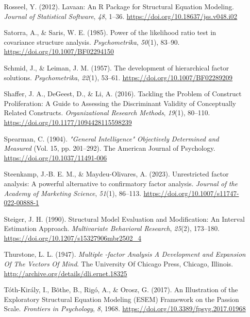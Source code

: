 \documentclass[
  american,
  man,floatsintext]{apa7}
\newlength{\cslhangindent}
\newenvironment{CSLReferences}[2] %
 {\begin{list}{}{%
  \setlength{\itemindent}{0pt}
  \setlength{\leftmargin}{0pt}
  \setlength{\parsep}{0pt}
  \ifodd #1
   \setlength{\leftmargin}{\cslhangindent}
   \setlength{\itemindent}{-1\cslhangindent}
  \fi
  \setlength{\itemsep}{#2\baselineskip}}}
 {\end{list}}
\begin{document}
\begin{CSLReferences}{1}{0}
Rosseel, Y. (2012). Lavaan: {An R Package} for {Structural Equation Modeling}. \emph{Journal of Statistical Software}, \emph{48}, 1--36. \url{https://doi.org/10.18637/jss.v048.i02}

Satorra, A., \& Saris, W. E. (1985). Power of the likelihood ratio test in covariance structure analysis. \emph{Psychometrika}, \emph{50}(1), 83--90. \url{https://doi.org/10.1007/BF02294150}

Schmid, J., \& Leiman, J. M. (1957). The development of hierarchical factor solutions. \emph{Psychometrika}, \emph{22}(1), 53--61. \url{https://doi.org/10.1007/BF02289209}

Shaffer, J. A., DeGeest, D., \& Li, A. (2016). Tackling the {Problem} of {Construct Proliferation}: {A Guide} to {Assessing} the {Discriminant Validity} of {Conceptually Related Constructs}. \emph{Organizational Research Methods}, \emph{19}(1), 80--110. \url{https://doi.org/10.1177/1094428115598239}

Spearman, C. (1904). \emph{"{General Intelligence}" {Objectively Determined} and {Measured}} (Vol. 15, pp. 201--292). The American Journal of Psychology. \url{https://doi.org/10.1037/11491-006}

Steenkamp, J.-B. E. M., \& Maydeu-Olivares, A. (2023). Unrestricted factor analysis: {A} powerful alternative to confirmatory factor analysis. \emph{Journal of the Academy of Marketing Science}, \emph{51}(1), 86--113. \url{https://doi.org/10.1007/s11747-022-00888-1}

Steiger, J. H. (1990). Structural {Model Evaluation} and {Modification}: {An Interval Estimation Approach}. \emph{Multivariate Behavioral Research}, \emph{25}(2), 173--180. \url{https://doi.org/10.1207/s15327906mbr2502_4}

Thurstone, L. L. (1947). \emph{Multiple -factor {Analysis A Development} and {Expansion Of The Vectors Of Mind}}. The University Of Chicago Press, Chicago, Illinois. \url{http://archive.org/details/dli.ernet.18325}

Tóth-Király, I., Bõthe, B., Rigó, A., \& Orosz, G. (2017). An {Illustration} of the {Exploratory Structural Equation Modeling} ({ESEM}) {Framework} on the {Passion Scale}. \emph{Frontiers in Psychology}, \emph{8}, 1968. \url{https://doi.org/10.3389/fpsyg.2017.01968}


\end{CSLReferences}
\end{document}
